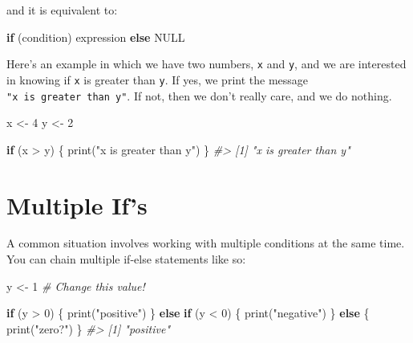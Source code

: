 \documentclass[
]{book}
\newenvironment{Shaded}{\begin{snugshade}}{\end{snugshade}}
\newcommand{\CommentTok}[1]{\textcolor[rgb]{0.56,0.35,0.01}{\textit{#1}}}
\newcommand{\ConstantTok}[1]{\textcolor[rgb]{0.00,0.00,0.00}{#1}}
\newcommand{\ControlFlowTok}[1]{\textcolor[rgb]{0.13,0.29,0.53}{\textbf{#1}}}
\newcommand{\DecValTok}[1]{\textcolor[rgb]{0.00,0.00,0.81}{#1}}
\newcommand{\FunctionTok}[1]{\textcolor[rgb]{0.00,0.00,0.00}{#1}}
\newcommand{\NormalTok}[1]{#1}
\newcommand{\OtherTok}[1]{\textcolor[rgb]{0.56,0.35,0.01}{#1}}
\newcommand{\SpecialCharTok}[1]{\textcolor[rgb]{0.00,0.00,0.00}{#1}}
\newcommand{\StringTok}[1]{\textcolor[rgb]{0.31,0.60,0.02}{#1}}
\begin{document}
and it is equivalent to:

\begin{Shaded}
\begin{Highlighting}[]
\ControlFlowTok{if}\NormalTok{ (condition) expression }\ControlFlowTok{else} \ConstantTok{NULL}
\end{Highlighting}
\end{Shaded}

Here's an example in which we have two numbers, \texttt{x} and \texttt{y}, and we are
interested in knowing if \texttt{x} is greater than \texttt{y}. If yes, we print the message
\texttt{"x\ is\ greater\ than\ y"}. If not, then we don't really care, and we do nothing.

\begin{Shaded}
\begin{Highlighting}[]
\NormalTok{x }\OtherTok{\textless{}{-}} \DecValTok{4}
\NormalTok{y }\OtherTok{\textless{}{-}} \DecValTok{2}

\ControlFlowTok{if}\NormalTok{ (x }\SpecialCharTok{\textgreater{}}\NormalTok{ y) \{}
  \FunctionTok{print}\NormalTok{(}\StringTok{"x is greater than y"}\NormalTok{)}
\NormalTok{\}}
\CommentTok{\#\textgreater{} [1] "x is greater than y"}
\end{Highlighting}
\end{Shaded}

\hypertarget{multiple-ifs}{%
\section{Multiple If's}\label{multiple-ifs}}

A common situation involves working with multiple conditions at the same time.
You can chain multiple if-else statements like so:

\begin{Shaded}
\begin{Highlighting}[]
\NormalTok{y }\OtherTok{\textless{}{-}} \DecValTok{1} \CommentTok{\# Change this value!}

\ControlFlowTok{if}\NormalTok{ (y }\SpecialCharTok{\textgreater{}} \DecValTok{0}\NormalTok{) \{}
  \FunctionTok{print}\NormalTok{(}\StringTok{"positive"}\NormalTok{)}
\NormalTok{\} }\ControlFlowTok{else} \ControlFlowTok{if}\NormalTok{ (y }\SpecialCharTok{\textless{}} \DecValTok{0}\NormalTok{) \{}
  \FunctionTok{print}\NormalTok{(}\StringTok{"negative"}\NormalTok{)}
\NormalTok{\} }\ControlFlowTok{else}\NormalTok{ \{}
  \FunctionTok{print}\NormalTok{(}\StringTok{"zero?"}\NormalTok{)}
\NormalTok{\}}
\CommentTok{\#\textgreater{} [1] "positive"}
\end{Highlighting}
\end{Shaded}
\end{document}
